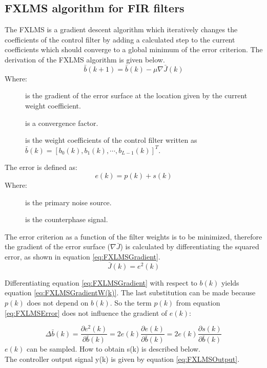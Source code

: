 \subsection{FXLMS algorithm for FIR filters}\label{subsec:fxlms}
The FXLMS is a gradient descent algorithm which iteratively changes the coefficients of the control filter by adding a calculated step to the current coefficients which should converge to a global minimum of the error criterion. The derivation of the FXLMS algorithm is given below. 
\begin{equation}\label{eq:FXLMSNewCoef}
\bar{b}(k+1) = \bar{b}(k) - \mu\nabla \bar{J}(k)
\end{equation}
Where:
\begin{description}
	\item[] is the gradient of the error surface at the location given by the current weight coefficient.
	\item[\text{$\mu$}] is a convergence factor.
	\item[] is the weight coefficients of the control filter written as  $\bar{b}(k)=[b_0(k),b_1(k) ,\cdots, b_{L-1}(k)]^T$.
\end{description}
The error is defined as:
\begin{equation}\label{eq:FXLMSError}
e(k) = p(k) + s(k)
\end{equation}
Where:
\begin{description}
	\item[] is the primary noise source.
	\item[] is the counterphase signal.
\end{description}

The error criterion as a function of the filter weights is to be minimized, therefore the gradient of the error surface ($\nabla \bar{J}$) is calculated by differentiating the squared error, as shown in equation \ref{eq:FXLMSGradient}.
\begin{equation}\label{eq:FXLMSGradient}
\bar{J}(k) = e^2(k)
\end{equation}

Differentiating equation \ref{eq:FXLMSGradient} with respect to $b(k)$ yields equation \ref{eq:FXLMSGradientW(k)}. The last substitution can be made because $p(k)$ does not depend on $b(k)$. So the term $p(k)$ from equation \ref{eq:FXLMSError} does not influence the gradient of $e(k)$:

\begin{equation}\label{eq:FXLMSGradientW(k)}
\Delta \bar{b}(k) = \frac{\partial e^2(k)}{\partial \bar{b}(k)} = 2e(k)\frac{\partial e(k)}{\partial \bar{b}(k)} = 2e(k)\frac{\partial s(k)}{\partial \bar{b}(k)}
\end{equation}
$e(k)$ can be sampled. How to obtain s(k) is described below. \\
The controller output signal y(k) is given by equation \ref{eq:FXLMSOutput}.

